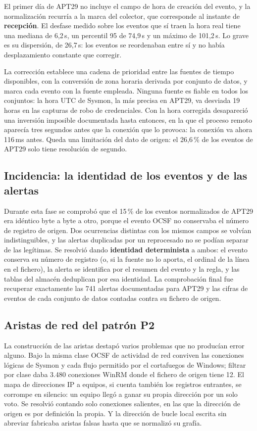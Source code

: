 El primer día de APT29 no incluye el campo de hora de creación del evento, y la
normalización recurría a la marca del colector, que corresponde al instante de
\textbf{recepción}. El desfase medido sobre los eventos que sí traen la hora real tiene una
mediana de 6,2\,s, un percentil 95 de 74,9\,s y un máximo de 101,2\,s. Lo grave es su
dispersión, de 26,7\,s: los eventos se reordenaban entre sí y no había desplazamiento
constante que corregir.

La corrección establece una cadena de prioridad entre las fuentes de tiempo disponibles, con
la conversión de zona horaria derivada por conjunto de datos, y marca cada evento con la
fuente empleada. Ninguna fuente es fiable en todos los conjuntos: la hora UTC de Sysmon, la
más precisa en APT29, va desviada 19 horas en las capturas de robo de credenciales. Con la
hora corregida desapareció una inversión imposible documentada hasta entonces, en la que el
proceso remoto aparecía tres segundos antes que la conexión que lo provoca: la conexión va
ahora 116\,ms antes. Queda una limitación del dato de origen: el 26,6\,\% de los eventos de
APT29 solo tiene resolución de segundo.


\subsection{Incidencia: la identidad de los eventos y de las alertas}

Durante esta fase se comprobó que el 15\,\% de los eventos normalizados de APT29 era idéntico
byte a byte a otro, porque el evento OCSF no conservaba el número de registro de origen. Dos
ocurrencias distintas con los mismos campos se volvían indistinguibles, y las alertas
duplicadas por un reprocesado no se podían separar de las legítimas. Se resolvió dando
\textbf{identidad determinista} a ambos: el evento conserva su número de registro (o, si la
fuente no lo aporta, el ordinal de la línea en el fichero), la alerta se identifica por el
resumen del evento y la regla, y las tablas del almacén deduplican por esa identidad. La
comprobación final fue recuperar exactamente las 741 alertas documentadas para APT29 y las
cifras de eventos de cada conjunto de datos contadas contra su fichero de origen.

\subsection{Aristas de red del patrón P2}

La construcción de las aristas destapó varios problemas que no producían error alguno.
Bajo la misma clase OCSF de actividad de red conviven las conexiones lógicas de Sysmon y
cada flujo permitido por el cortafuegos de Windows; filtrar por clase daba 3.480 conexiones
WinRM donde el fichero de origen tiene 12. El mapa de direcciones IP a equipos, si cuenta
también los registros entrantes, se corrompe en silencio: un equipo llegó a ganar su propia
dirección por un solo voto. Se resolvió contando solo conexiones salientes, en las que la
dirección de origen es por definición la propia. Y la dirección de bucle local escrita sin
abreviar fabricaba aristas falsas hasta que se normalizó su grafía.


